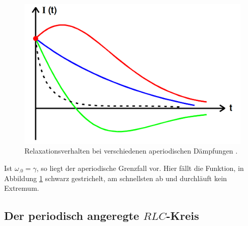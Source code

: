 \begin{figure}
\centering
\includegraphics[width=\linewidth-200pt,height=\textheight-200pt,keepaspectratio]{content/images/daempfungen.png}
\caption{Relaxationsverhalten bei verschiedenen aperiodischen Dämpfungen \cite{V354}.}
\label{fig:Daempfungen}
\end{figure}

\noindent Ist $\omega_.0=\gamma$, so liegt der aperiodische Grenzfall vor. Hier fällt die Funktion, in Abbildung \ref{fig:Daempfungen} schwarz gestrichelt, am schnellsten ab und durchläuft kein Extremum.  

\subsection{Der periodisch angeregte $RLC$-Kreis}
\label{subsec:RLCPeriodischAngeregt}

